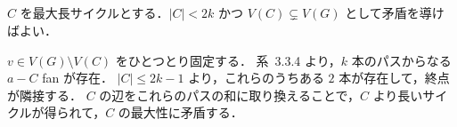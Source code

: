 \subsection{}
$C$ を最大長サイクルとする．$|C| < 2k$ かつ $V(C)\subsetneq V(G)$ として矛盾を導けばよい．

$v\in V(G)\setminus V(C)$ をひとつとり固定する．
系~3.3.4 より，$k$ 本のパスからなる $a-C$ fan が存在．
$|C|\leq 2k-1$ より，これらのうちある $2$ 本が存在して，終点が隣接する．
$C$ の辺をこれらのパスの和に取り換えることで，$C$ より長いサイクルが得られて，$C$ の最大性に矛盾する．

